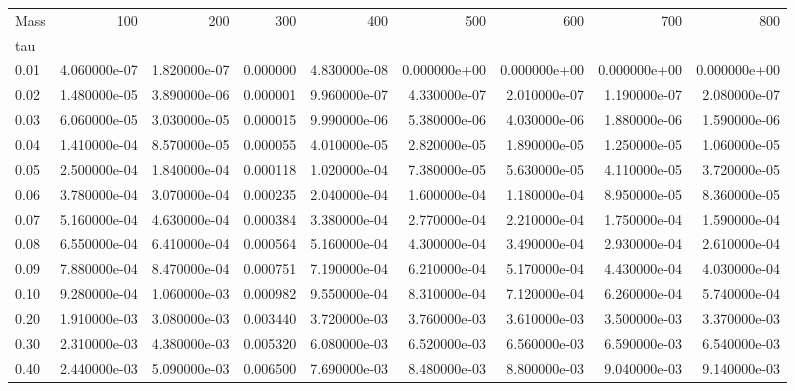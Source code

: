 \begin{tabular}{lrrrrrrrr}
\toprule
Mass &           100 &           200 &       300 &           400 &           500 &           600 &           700 &           800 \\
tau   &               &               &           &               &               &               &               &               \\
\midrule
0.01  &  4.060000e-07 &  1.820000e-07 &  0.000000 &  4.830000e-08 &  0.000000e+00 &  0.000000e+00 &  0.000000e+00 &  0.000000e+00 \\
0.02  &  1.480000e-05 &  3.890000e-06 &  0.000001 &  9.960000e-07 &  4.330000e-07 &  2.010000e-07 &  1.190000e-07 &  2.080000e-07 \\
0.03  &  6.060000e-05 &  3.030000e-05 &  0.000015 &  9.990000e-06 &  5.380000e-06 &  4.030000e-06 &  1.880000e-06 &  1.590000e-06 \\
0.04  &  1.410000e-04 &  8.570000e-05 &  0.000055 &  4.010000e-05 &  2.820000e-05 &  1.890000e-05 &  1.250000e-05 &  1.060000e-05 \\
0.05  &  2.500000e-04 &  1.840000e-04 &  0.000118 &  1.020000e-04 &  7.380000e-05 &  5.630000e-05 &  4.110000e-05 &  3.720000e-05 \\
0.06  &  3.780000e-04 &  3.070000e-04 &  0.000235 &  2.040000e-04 &  1.600000e-04 &  1.180000e-04 &  8.950000e-05 &  8.360000e-05 \\
0.07  &  5.160000e-04 &  4.630000e-04 &  0.000384 &  3.380000e-04 &  2.770000e-04 &  2.210000e-04 &  1.750000e-04 &  1.590000e-04 \\
0.08  &  6.550000e-04 &  6.410000e-04 &  0.000564 &  5.160000e-04 &  4.300000e-04 &  3.490000e-04 &  2.930000e-04 &  2.610000e-04 \\
0.09  &  7.880000e-04 &  8.470000e-04 &  0.000751 &  7.190000e-04 &  6.210000e-04 &  5.170000e-04 &  4.430000e-04 &  4.030000e-04 \\
0.10  &  9.280000e-04 &  1.060000e-03 &  0.000982 &  9.550000e-04 &  8.310000e-04 &  7.120000e-04 &  6.260000e-04 &  5.740000e-04 \\
0.20  &  1.910000e-03 &  3.080000e-03 &  0.003440 &  3.720000e-03 &  3.760000e-03 &  3.610000e-03 &  3.500000e-03 &  3.370000e-03 \\
0.30  &  2.310000e-03 &  4.380000e-03 &  0.005320 &  6.080000e-03 &  6.520000e-03 &  6.560000e-03 &  6.590000e-03 &  6.540000e-03 \\
0.40  &  2.440000e-03 &  5.090000e-03 &  0.006500 &  7.690000e-03 &  8.480000e-03 &  8.800000e-03 &  9.040000e-03 &  9.140000e-03 \\

\end{tabular}
